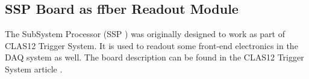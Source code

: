 \subsection{SSP Board as ffber Readout Module}

The SubSystem Processor (SSP \cite{ssp-ref}) was originally designed to work as part of CLAS12 Trigger System. It is used to readout some front-end electronics in the DAQ system as well. The board description can be found in the CLAS12 Trigger System article \cite{trig-ref}.